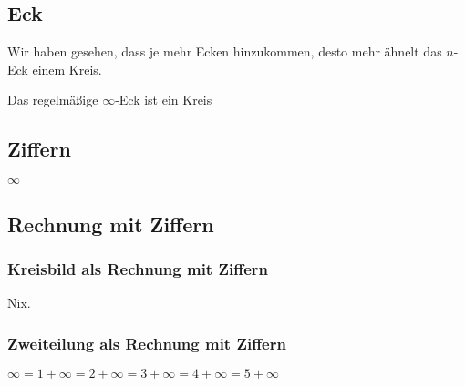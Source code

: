 \documentclass[a4paper]{amsart}
\theoremstyle{definition}
\begin{document}
\subsection{Eck}
Wir haben gesehen, dass je mehr Ecken hinzukommen, desto mehr ähnelt das $n$-Eck einem Kreis.

Das regelmäßige $\infty$-Eck ist ein Kreis
\vspace{\kategoryVspace}


\subsection{Ziffern}
\vspace{\kategoryVspace}

$\infty$

\subsection{Rechnung mit Ziffern}

\subsubsection{Kreisbild als Rechnung mit Ziffern}
Nix.

\subsubsection{Zweiteilung als Rechnung mit Ziffern}
$\infty = 1 + \infty = 2 + \infty = 3 + \infty = 4 + \infty = 5 + \infty$
\end{document}

